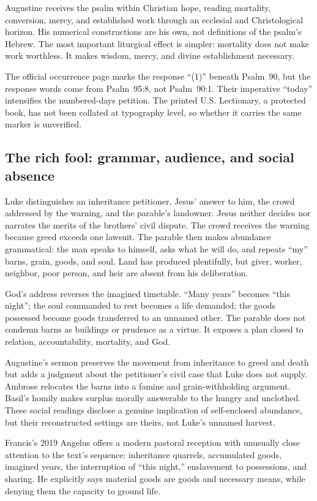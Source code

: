 Augustine receives the psalm within Christian hope, reading mortality,
conversion, mercy, and established work through an ecclesial and
Christological horizon. His numerical constructions are his own, not definitions of the psalm's Hebrew. The most important liturgical effect is
simpler: mortality does not make work worthless. It makes wisdom, mercy, and
divine establishment necessary.

The official occurrence page marks the response “(1)” beneath Psalm~90, but
the response words come from Psalm~95:8, not Psalm~90:1. Their imperative
“today” intensifies the numbered-days petition. The printed U.S. Lectionary, a
protected book, has not been collated at typography level, so whether it
carries the same marker is unverified.

\subsection*{The rich fool: grammar, audience, and social absence}

Luke distinguishes an inheritance petitioner, Jesus' answer to him, the crowd
addressed by the warning, and the parable's landowner. Jesus neither decides
nor narrates the merits of the brothers' civil dispute. The crowd receives the
warning because greed exceeds one lawsuit. The parable then makes abundance
grammatical: the man speaks to himself, asks what he will do, and repeats
``my'' barns, grain, goods, and soul. Land has produced plentifully, but giver,
worker, neighbor, poor person, and heir are absent from his deliberation.

God's address reverses the imagined timetable. “Many years” becomes “this
night”; the soul commanded to rest becomes a life demanded; the goods
possessed become goods transferred to an unnamed other. The parable does not
condemn barns as buildings or prudence as a virtue. It exposes a plan closed
to relation, accountability, mortality, and God.

Augustine's sermon preserves the movement from inheritance to greed and death
but adds a judgment about the petitioner's civil case that Luke does not
supply. Ambrose relocates the barns into a famine and grain-withholding
argument. Basil's homily makes surplus morally answerable to the hungry and
unclothed. These social readings disclose a genuine implication of
self-enclosed abundance, but their reconstructed settings are theirs, not Luke's unnamed harvest.

Francis's 2019 Angelus offers a modern pastoral reception with unusually close
attention to the text's sequence: inheritance quarrels, accumulated goods,
imagined years, the interruption of “this night,” enslavement to possessions,
and sharing. He explicitly says material goods are goods and necessary means,
while denying them the capacity to ground life.

